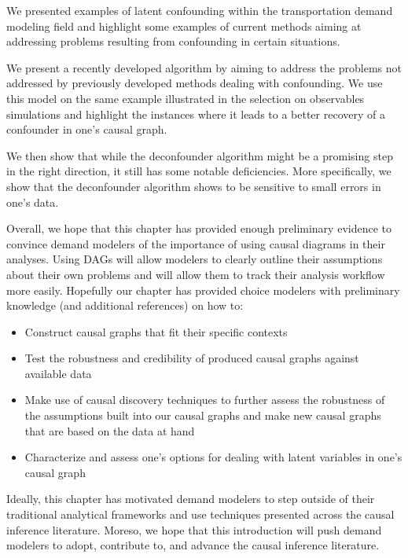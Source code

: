 We presented examples of latent confounding within the transportation demand modeling field and highlight 
some examples of current methods aiming at addressing problems resulting from confounding in certain situations.

We present a recently developed algorithm by \citet{wang_2019_blessings} aiming to address the problems not 
addressed by previously developed methods dealing with confounding. We use this model on the same example illustrated in
the selection on observables simulations and highlight the instances where it leads to a better recovery of 
a confounder in one's causal graph. 

We then show that while the deconfounder algorithm might be a promising step in the right direction, 
it still has some notable deficiencies. More specifically, we show that the deconfounder algorithm shows 
to be sensitive to small errors in one's data.

Overall, we hope that this chapter has provided enough preliminary evidence to convince demand modelers of the importance of using causal diagrams in their analyses.
Using DAGs will allow modelers to clearly outline their assumptions about their own problems and will allow them to track their analysis workflow more easily.
Hopefully our chapter has provided choice modelers with preliminary knowledge (and additional references) on how to:
\begin{itemize}
    \item Construct causal graphs that fit their specific contexts
    \item Test the robustness and credibility of produced causal graphs against available data
    \item Make use of causal discovery techniques to further assess the robustness of the assumptions built into our causal graphs and make new causal graphs that are based on the data at hand
    \item Characterize and assess one's options for dealing with latent variables in one's causal graph
\end{itemize}

Ideally, this chapter has motivated demand modelers to step outside of their traditional analytical frameworks and use techniques presented across the causal inference literature.
Moreso, we hope that this introduction will push demand modelers to adopt, contribute to, and advance the causal inference literature.
